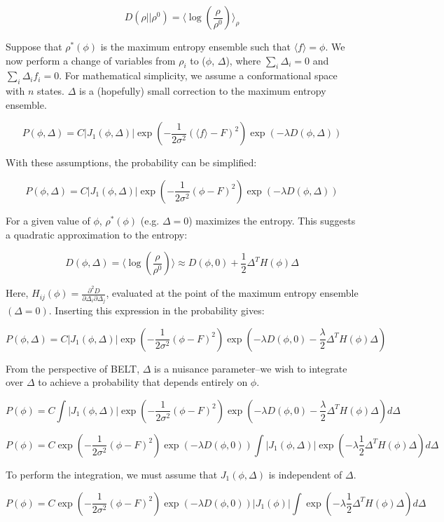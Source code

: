 \documentclass[12pt]{article}
\begin{document}
$$D(\rho || \rho^0) = \langle \log(\frac{\rho}{\rho^0})\rangle_\rho$$

Suppose that $\rho^*(\phi)$ is the maximum entropy ensemble such that $\langle f \rangle = \phi$.  We now perform a change of variables from $\rho_i$ to ($\phi$, $\Delta$), where $\sum_i \Delta_i = 0$ and $\sum_i \Delta_i f_i = 0$.  For mathematical simplicity, we assume a conformational space with $n$ states.  $\Delta$ is a (hopefully) small correction to the maximum entropy ensemble.  

$$P(\phi, \Delta) = C |J_1(\phi, \Delta)| \exp(-\frac{1}{2\sigma^2} (\langle f \rangle - F)^2) \exp(-\lambda D(\phi, \Delta)) $$

With these assumptions, the probability can be simplified:

$$P(\phi, \Delta) = C |J_1(\phi, \Delta)| \exp(-\frac{1}{2\sigma^2} (\phi - F)^2) \exp(-\lambda D(\phi, \Delta)) $$

For a given value of $\phi$, $\rho^*(\phi)$ (e.g. $\Delta = 0$) maximizes the entropy.  This suggests a quadratic approximation to the entropy:

$$D(\phi, \Delta) = \langle \log(\frac{\rho}{\rho^0})\rangle \approx D(\phi, 0) + \frac{1}{2} \Delta^T H(\phi) \Delta$$

Here, $H_{ij}(\phi) = \frac{\partial^2 D}{\partial \Delta_i \partial \Delta_j}$, evaluated at the point of the maximum entropy ensemble $(\Delta = 0)$.  Inserting this expression in the probability gives:

$$P(\phi, \Delta) = C |J_1(\phi, \Delta)| \exp(-\frac{1}{2\sigma^2} (\phi - F)^2) \exp(-\lambda  D(\phi, 0) - \frac{\lambda}{2} \Delta^T H(\phi) \Delta)$$

From the perspective of BELT, $\Delta$ is a nuisance parameter--we wish to integrate over $\Delta$ to achieve a probability that depends entirely on $\phi$.  

$$P(\phi) = C \int |J_1(\phi, \Delta)| \exp(-\frac{1}{2\sigma^2} (\phi - F)^2) \exp(-\lambda  D(\phi, 0) - \frac{\lambda}{2} \Delta^T H(\phi) \Delta) d\Delta $$

$$P(\phi) = C \exp(-\frac{1}{2\sigma^2} (\phi - F)^2) \exp(-\lambda  D(\phi, 0))  \int |J_1(\phi, \Delta)|  \exp(-\lambda \frac{1}{2} \Delta^T H(\phi) \Delta) d\Delta $$

To perform the integration, we must assume that $J_1(\phi, \Delta)$ is independent of $\Delta$.

$$P(\phi) = C \exp(-\frac{1}{2\sigma^2} (\phi - F)^2) \exp(-\lambda  D(\phi, 0)) |J_1(\phi)|  \int   \exp(-\lambda \frac{1}{2} \Delta^T H(\phi) \Delta) d\Delta $$
\end{document}
